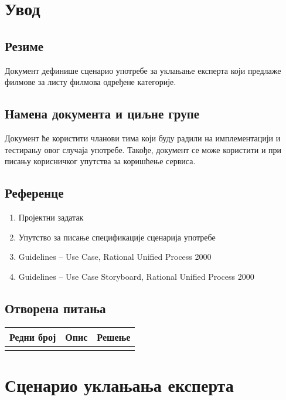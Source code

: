 \section{Увод}

\subsection{Резиме}

Документ дефинише сценарио употребе за уклањање експерта који предлаже филмове за листу
филмова одређене категорије.

\subsection{Намена документа и циљне групе}

Документ ће користити чланови тима који буду радили на имплементацији и тестирању овог случаја
употребе. Такође, документ се може користити и при писању корисничког упутства за коришћење
сервиса.

\subsection{Референце}

\begin{enumerate}
    \item Пројектни задатак
    \item Упутство за писање спецификације сценарија употребе
    \item Guidelines – Use Case, Rational Unified Process 2000
    \item Guidelines – Use Case Storyboard, Rational Unified Process 2000
\end{enumerate}

\subsection{Отворена питања}

\noindent
\setcellgapes{4pt}
\makegapedcells
\begin{tabularx}{\linewidth}{|l|X|X|}
    \hline
    \textbf{Редни број} & \textbf{Опис} & \textbf{Решење} \\
    \hline
    & & \\
    \hline
\end{tabularx}

\section{Сценарио уклањања експерта}

